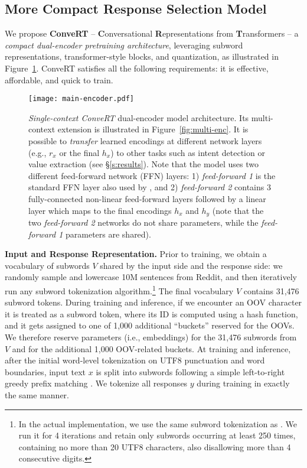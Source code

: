 \documentclass[11pt,a4paper]{article}
\begin{document}
\subsection{More Compact Response Selection Model}
\label{ss:main}
We propose \textbf{ConveRT} -- \textbf{C}onversational \textbf{R}epresentations from \textbf{T}ransformers -- 
a \textit{compact dual-encoder pretraining architecture}, leveraging subword representations, transformer-style blocks, and quantization, as illustrated in Figure~\ref{fig:main-enc}. ConveRT satisfies all the following requirements: it is effective, affordable, and quick to train.



\begin{figure}[!t]
\centering
\texttt{[image: main-encoder.pdf]}
\vspace{-2mm}
\caption{\textit{Single-context ConveRT} dual-encoder model architecture. Its multi-context extension is illustrated in Figure~\ref{fig:multi-enc}. It is possible to \textit{transfer} learned encodings at different network layers (e.g., $r_x$ or the final $h_x$) to other tasks such as intent detection or value extraction (see \S\ref{s:results}).
Note that the model uses two different feed-forward network (FFN) layers: 1) \textit{feed-forward 1} is the standard FFN layer also used by , and 2) \textit{feed-forward 2} contains 3 fully-connected non-linear feed-forward layers followed by a linear layer which maps to the final encodings $h_x$ and $h_y$ (note that the two \textit{feed-forward 2} networks do not share parameters, while the \textit{feed-forward 1} parameters are shared).
}
\vspace{-2.5mm}
\label{fig:main-enc}
\end{figure}



\vspace{1.3mm}
\noindent \textbf{Input and Response Representation.} 
Prior to training, we obtain a vocabulary of subwords $V$ shared by the input side and the response side: we randomly sample and lowercase 10M sentences from Reddit, and then iteratively run any subword tokenization algorithm.\footnote{In the actual implementation, we use the same subword tokenization as . We run it for 4 iterations and retain only subwords occurring at least 250 times, containing no more than 20 UTF8 characters, also disallowing more than 4 consecutive digits.} The final vocabulary $V$ contains 31,476 subword tokens. During training and inference, if we encounter an OOV character it is treated as a subword token, where its ID is computed using a hash function, and it gets assigned to one of 1,000 additional ``buckets'' reserved for the OOVs. We therefore reserve parameters (i.e., embeddings) for the 31,476 subwords from $V$ and for the additional 1,000 OOV-related buckets. At training and inference, after the initial word-level tokenization on UTF8 punctuation and word boundaries, input text $x$ is split into subwords following a simple left-to-right greedy prefix matching \cite{vaswani2018}. We tokenize all responses $y$ during training in exactly the same manner.
\end{document}
